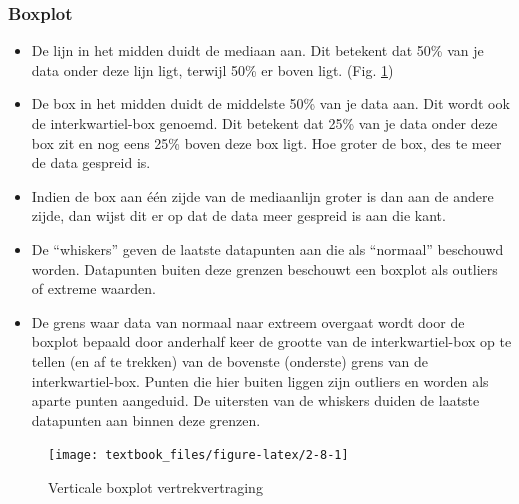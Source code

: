 \documentclass[]{tufte-book}
\providecommand{\tightlist}{%
  \setlength{\itemsep}{0pt}\setlength{\parskip}{0pt}}
\begin{document}
\hypertarget{boxplot}{%
\subsubsection{Boxplot}\label{boxplot}}

\begin{itemize}
\tightlist
\item
  De lijn in het midden duidt de mediaan aan. Dit betekent dat 50\% van je data onder deze lijn ligt, terwijl 50\% er boven ligt. (Fig. \ref{fig:2-8})
\item
  De box in het midden duidt de middelste 50\% van je data aan. Dit wordt ook de interkwartiel-box genoemd. Dit betekent dat 25\% van je data onder deze box zit en nog eens 25\% boven deze box ligt. Hoe groter de box, des te meer de data gespreid is.
\item
  Indien de box aan één zijde van de mediaanlijn groter is dan aan de andere zijde, dan wijst dit er op dat de data meer gespreid is aan die kant.
\item
  De ``whiskers'' geven de laatste datapunten aan die als ``normaal'' beschouwd worden. Datapunten buiten deze grenzen beschouwt een boxplot als outliers of extreme waarden.
\item
  De grens waar data van normaal naar extreem overgaat wordt door de boxplot bepaald door anderhalf keer de grootte van de interkwartiel-box op te tellen (en af te trekken) van de bovenste (onderste) grens van de interkwartiel-box. Punten die hier buiten liggen zijn outliers en worden als aparte punten aangeduid. De uitersten van de whiskers duiden de laatste datapunten aan binnen deze grenzen.
\end{itemize}

\begin{figure}

{\centering \texttt{[image: textbook\_files/figure-latex/2-8-1]} 

}

\caption[Verticale boxplot vertrekvertraging]{Verticale boxplot vertrekvertraging}\label{fig:2-8}
\end{figure}
\end{document}
